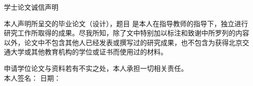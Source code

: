 \cleardoublepage{}

\thispagestyle{fancynofoot} 
\vspace*{-0.53cm}
\begin{center}
{\heiti 学士论文诚信声明\bigskip}
\end{center}

本人声明所呈交的毕业论文（设计），题目 \underline{\makebox[15em]{}}是本人在指导教师的指导下，独立进行研究工作所取得的成果。尽我所知，除了文中特别加以标注和致谢中所罗列的内容以外，论文中不包含其他人已经发表或撰写过的研究成果，也不包含为获得北京交通大学或其他教育机构的学位或证书而使用过的材料。

申请学位论文与资料若有不实之处，本人承担一切相关责任。\\

本人签名：\underline{\makebox[10em]{}} \qquad 日期：\underline{\makebox[10em]{}}                
\newpage